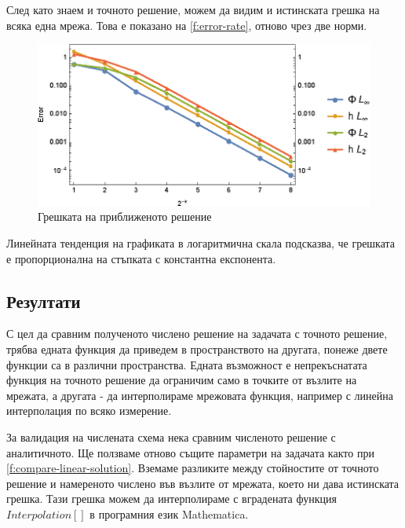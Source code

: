 \documentclass[12pt]{article}
\numberwithin{equation}{section}
\begin{document}
След като знаем и точното решение, можем да видим и истинската грешка на всяка една мрежа. Това е показано на \autoref{f:error-rate}, отново чрез две норми.

\begin{figure}[h]
    \centering
    \includegraphics{figures/results/error-rate.eps}
    \caption{Грешката на приближеното решение}
    \label{f:error-rate}
\end{figure}

Линейната тенденция на графиката в логаритмична скала подсказва, че грешката е пропорционална на стъпката с константна експонента.

\subsection{Резултати}
С цел да сравним полученото числено решение на задачата с точното решение, трябва едната функция да приведем в пространството на другата, понеже двете функции са в различни пространства. Едната възможност е непрекъснатата функция на точното решение да ограничим само в точките от възлите на мрежата, а другата - да интерполираме мрежовата функция, например с линейна интерполация по всяко измерение.

За валидация на числената схема нека сравним численото решение с аналитичното. Ще ползваме отново същите параметри на задачата както при \autoref{f:compare-linear-solution}. Вземаме разликите между стойностите от точното решение и намереното числено във възлите от мрежата, което ни дава истинската грешка. Тази грешка можем да интерполираме с вградената функция $Interpolation[]$ в програмния език Mathematica.
\end{document}
